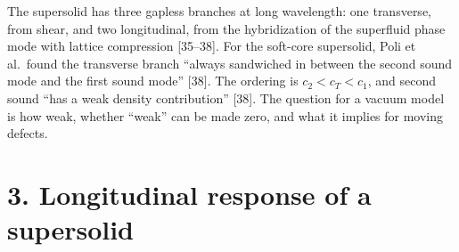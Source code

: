 \documentclass[
  11pt,
]{article}
\begin{document}
The supersolid has three gapless branches at long wavelength: one
transverse, from shear, and two longitudinal, from the hybridization of
the superfluid phase mode with lattice compression {[}35--38{]}. For the
soft-core supersolid, Poli et al.~found the transverse branch ``always
sandwiched in between the second sound mode and the first sound mode''
{[}38{]}. The ordering is \(c_2<c_T<c_1\), and second sound ``has a weak
density contribution'' {[}38{]}. The question for a vacuum model is how
weak, whether ``weak'' can be made zero, and what it implies for moving
defects.

\hypertarget{longitudinal-response-of-a-supersolid}{%
\section{3. Longitudinal response of a
supersolid}\label{longitudinal-response-of-a-supersolid}}
\end{document}
